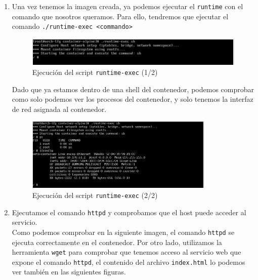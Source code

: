 \documentclass[12pt]{article}
\begin{document}
\begin{enumerate}
		
		\item Una vez tenemos la imagen creada, ya podemos ejecutar el \texttt{runtime} con el comando que nosotros queramos. Para ello, tendremos que ejecutar el comando \texttt{./runtime-exec <commando>}
		
		\begin{figure}[h!]
			\begin{center}
				\includegraphics[width=1\textwidth]{img/container_runtime1.png}
				\caption{Ejecución del script \texttt{runtime-exec} (1/2)}
			\end{center}
		\end{figure}
	
		\noindent Dado que ya estamos dentro de una shell del contenedor, podemos comprobar como solo podemos ver los procesos del contenedor, y solo tenemos la interfaz de red asignada al contenedor.
		
		\begin{figure}[h!]
			\begin{center}
				\includegraphics[width=0.85\textwidth]{img/container_runtime2.png}
				\caption{Ejecución del script \texttt{runtime-exec} (2/2)}
			\end{center}
		\end{figure}
	
		\item Ejecutamos el comando \texttt{httpd} y comprobamos que el host puede acceder al servicio. \\
		
		\noindent Como podemos comprobar en la siguiente imagen, el comando \texttt{httpd} se ejecuta correctamente en el contenedor. Por otro lado, utilizamos la herramienta \texttt{wget} para comprobar que tenemos acceso al servicio web que expone el comando \texttt{httpd}, el contenido del archivo \texttt{index.html} lo podemos ver también en las siguientes figuras.
		

\end{enumerate}
\end{document}
